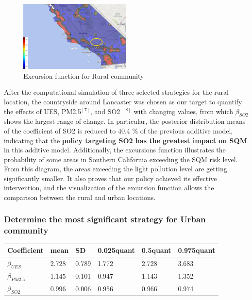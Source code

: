 \documentclass{mcmthesis}
\begin{document}
\begin{figure}[htp]
    \centering
    \includegraphics[width=0.5\textwidth]{images/qwq.png}
    \caption{Excursion function for Rural community}
    \label{pre1}
\end{figure}
\newpage
After the computational simulation of three selected strategies for the rural location, the countryside around Lancaster was chosen as our target to quantify the effects of UES, PM2.5$^{[7]}$, and SO2 $^{[8]}$ with changing values, from which $\beta_{SO2}$ shows the largest range of change. In particular, the posterior distribution means of the coefficient of SO2 is reduced to 40.4 $\%$ of the previous additive model, indicating that the \textbf{policy targeting SO2 has the greatest impact on SQM} in this additive model. Additionally, the excursions function illustrates the probability of some areas in Southern California exceeding the SQM risk level. From this diagram, the areas exceeding the light pollution level are getting significantly smaller. It also proves that our policy achieved its effective intervention, and the visualization of the excursion function allows the comparison between the rural and urban locations.    


\subsubsection{Determine the most significant strategy for Urban community}

\begin{center}
\begin{tabular}{llllll}
\hline
Coefficient & mean & SD & 0.025quant & 0.5quant & 0.975quant\\
\hline
$\beta_{UES}$& 2.728 & 0.789 & 1.772 & 2.728 & 3.683         \\
$\beta_{PM2.5}$& 1.145 & 0.101 & 0.947 & 1.143 & 1.352      \\
$\beta_{SO2}$& 0.996 & 0.006 & 0.956 & 0.966 & 0.974            \\
\hline 
                                
\end{tabular}
\end{center}
\end{document}
